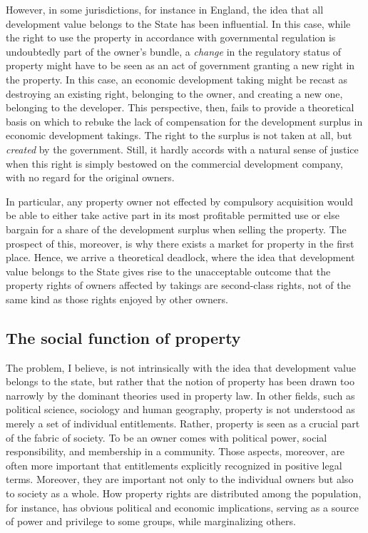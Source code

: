 However, in some jurisdictions, for instance in England, the idea that all development value belongs to the State has been influential. In this case, while the right to use the property in accordance with governmental regulation is undoubtedly part of the owner's bundle, a {\it change} in the regulatory status of property might have to be seen as an act of government granting a new right in the property. In this case, an economic development taking might be recast as destroying an existing right, belonging to the owner, and creating a new one, belonging to the developer. This perspective, then, fails to provide a theoretical basis on which to rebuke the lack of compensation for the development surplus in economic development takings. The right to the surplus is not taken at all, but {\it created} by the government. Still, it hardly accords with a natural sense of justice when this right is simply bestowed on the commercial development company, with no regard for the original owners. 

In particular, any property owner not effected by compulsory acquisition would be able to either take active part in its most profitable permitted use or else bargain for a share of the development surplus when selling the property. The prospect of this, moreover, is why there exists a market for property in the first place. Hence, we arrive a theoretical deadlock, where the idea that development value belongs to the State gives rise to the unacceptable outcome that the property rights of owners affected by takings are second-class rights, not of the same kind as those rights enjoyed by other owners.

\subsection{The social function of property}

The problem, I believe, is not intrinsically with the idea that development value belongs to the state, but rather that the notion of property has been drawn too narrowly by the dominant theories used in property law. In other fields, such as political science, sociology and human geography, property is not understood as merely a set of individual entitlements. Rather, property is seen as a crucial part of the fabric of society. To be an owner comes with political power, social responsibility, and membership in a community. Those aspects, moreover, are often more important that entitlements explicitly recognized in positive legal terms. Moreover, they are important not only to the individual owners but also to society as a whole. How property rights are distributed among the population, for instance, has obvious political and economic implications, serving as a source of power and privilege to some groups, while marginalizing others. 

